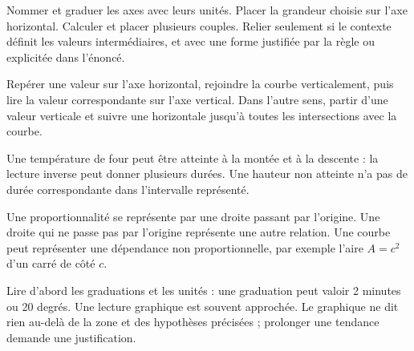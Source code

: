 \begin{savoirfaire}[Construire]Nommer et graduer les axes avec leurs unités. Placer la grandeur choisie sur l’axe horizontal. Calculer et placer plusieurs couples. Relier seulement si le contexte définit les valeurs intermédiaires, et avec une forme justifiée par la règle ou explicitée dans l’énoncé.\end{savoirfaire}
\clearpage
{}\label{cours-9-2}
\begin{savoirfaire}Repérer une valeur sur l’axe horizontal, rejoindre la courbe verticalement, puis lire la valeur correspondante sur l’axe vertical. Dans l’autre sens, partir d’une valeur verticale et suivre une horizontale jusqu’à toutes les intersections avec la courbe.\end{savoirfaire}
\begin{exemple}Une température de four peut être atteinte à la montée et à la descente : la lecture inverse peut donner plusieurs durées. Une hauteur non atteinte n’a pas de durée correspondante dans l’intervalle représenté.\end{exemple}
\begin{propriete}Une proportionnalité se représente par une droite passant par l’origine. Une droite qui ne passe pas par l’origine représente une autre relation. Une courbe peut représenter une dépendance non proportionnelle, par exemple l’aire $A=c^2$ d’un carré de côté $c$.\end{propriete}
\begin{attention}Lire d’abord les graduations et les unités : une graduation peut valoir 2 minutes ou 20 degrés. Une lecture graphique est souvent approchée. Le graphique ne dit rien au-delà de la zone et des hypothèses précisées ; prolonger une tendance demande une justification.\end{attention}

